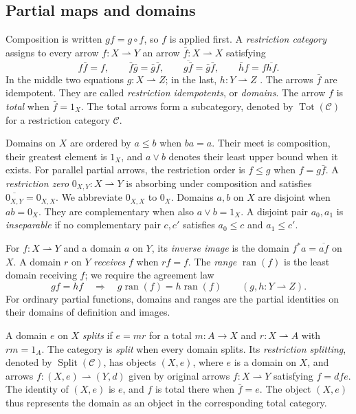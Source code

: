 \documentclass[11pt]{article}
\newcommand{\ran}{\operatorname{ran}}
\begin{document}
\subsection{Partial maps and domains}

Composition is written $gf=g\circ f$, so $f$ is applied first.
A \emph{restriction category} assigns to every arrow
$f:X\rightharpoonup Y$ an arrow
$\bar f:X\rightharpoonup X$ satisfying
\[
 f\bar f=f,\qquad
 \bar f\bar g=\bar g\bar f,\qquad
 \overline{g\bar f}=\bar g\bar f,\qquad
 \bar h f=f\overline{hf}.
\]
In the middle two equations $g:X\rightharpoonup Z$; in the last,
$h:Y\rightharpoonup Z$ \cite{CockettLack}.
The arrows $\bar f$ are idempotent. They are called
\emph{restriction idempotents}, or \emph{domains}.
The arrow $f$ is \emph{total} when $\bar f=1_X$.
The total arrows form a subcategory, denoted by
$\operatorname{Tot}(\mathcal C)$ for a restriction category $\mathcal C$.

Domains on $X$ are ordered by $a\le b$ when $ba=a$.
Their meet is composition, their greatest element is $1_X$, and
$a\vee b$ denotes their least upper bound when it exists.
For parallel partial arrows, the restriction order is
$f\le g$ when $f=g\bar f$.
A \emph{restriction zero} $0_{X,Y}:X\rightharpoonup Y$ is
absorbing under composition and satisfies
$\overline{0_{X,Y}}=0_{X,X}$. We abbreviate $0_{X,X}$ to $0_X$.
Domains $a,b$ on $X$ are disjoint when $ab=0_X$.
They are complementary when also $a\vee b=1_X$.
A disjoint pair $a_0,a_1$ is \emph{inseparable} if no complementary
pair $c,c'$ satisfies $a_0\le c$ and $a_1\le c'$.

For $f:X\rightharpoonup Y$ and a domain $a$ on $Y$, its
\emph{inverse image} is the domain $f^*a=\overline{af}$ on $X$.
A domain $r$ on $Y$ \emph{receives} $f$ when $rf=f$.
The \emph{range} $\ran(f)$ is the least domain receiving $f$;
we require the agreement law
\[
 gf=hf\quad\Longrightarrow\quad
 g\ran(f)=h\ran(f)
 \qquad(g,h:Y\rightharpoonup Z).
\]
For ordinary partial functions, domains and ranges are the partial
identities on their domains of definition and images.

A domain $e$ on $X$ \emph{splits} if
$e=mr$ for a total $m:A\to X$ and $r:X\rightharpoonup A$
with $rm=1_A$. The category is \emph{split} when every domain splits.
Its \emph{restriction splitting}, denoted by
$\operatorname{Split}(\mathcal C)$, has objects $(X,e)$, where $e$ is a
domain on $X$, and arrows
$f:(X,e)\rightharpoonup(Y,d)$ given by original arrows
$f:X\rightharpoonup Y$ satisfying $f=dfe$.
The identity of $(X,e)$ is $e$, and $f$ is total there when
$\bar f=e$. The object $(X,e)$ thus represents the domain as an
object in the corresponding total category.
\end{document}
